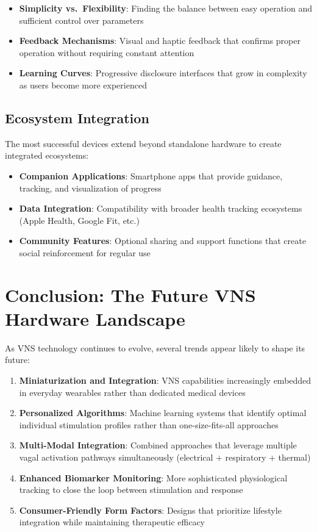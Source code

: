 \documentclass[
  Letterpaper,
]{scrbook}
\providecommand{\tightlist}{%
  \setlength{\itemsep}{0pt}\setlength{\parskip}{0pt}}\usepackage{longtable,booktabs,array}
\begin{document}
\begin{itemize}
\tightlist
\item
  \textbf{Simplicity vs.~Flexibility}: Finding the balance between easy
  operation and sufficient control over parameters
\item
  \textbf{Feedback Mechanisms}: Visual and haptic feedback that confirms
  proper operation without requiring constant attention
\item
  \textbf{Learning Curves}: Progressive disclosure interfaces that grow
  in complexity as users become more experienced
\end{itemize}

\subsection{Ecosystem Integration}\label{ecosystem-integration}

The most successful devices extend beyond standalone hardware to create
integrated ecosystems:

\begin{itemize}
\tightlist
\item
  \textbf{Companion Applications}: Smartphone apps that provide
  guidance, tracking, and visualization of progress
\item
  \textbf{Data Integration}: Compatibility with broader health tracking
  ecosystems (Apple Health, Google Fit, etc.)
\item
  \textbf{Community Features}: Optional sharing and support functions
  that create social reinforcement for regular use
\end{itemize}

\section{Conclusion: The Future VNS Hardware
Landscape}\label{conclusion-the-future-vns-hardware-landscape}

As VNS technology continues to evolve, several trends appear likely to
shape its future:

\begin{enumerate}
\def\labelenumi{\arabic{enumi}.}
\item
  \textbf{Miniaturization and Integration}: VNS capabilities
  increasingly embedded in everyday wearables rather than dedicated
  medical devices
\item
  \textbf{Personalized Algorithms}: Machine learning systems that
  identify optimal individual stimulation profiles rather than
  one-size-fits-all approaches
\item
  \textbf{Multi-Modal Integration}: Combined approaches that leverage
  multiple vagal activation pathways simultaneously (electrical +
  respiratory + thermal)
\item
  \textbf{Enhanced Biomarker Monitoring}: More sophisticated
  physiological tracking to close the loop between stimulation and
  response
\item
  \textbf{Consumer-Friendly Form Factors}: Designs that prioritize
  lifestyle integration while maintaining therapeutic efficacy
\end{enumerate}
\end{document}
